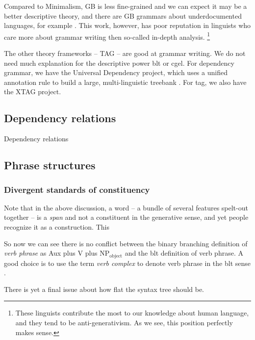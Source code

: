 \documentclass[../main.tex]{subfiles}
\begin{document}
Compared to Minimalism, GB is less fine-grained and we can expect it may be a better descriptive theory,
and there are GB grammars about underdocumented languages, for example \citet{holmer1996parametric}. 
This work, however, has poor reputation in linguists who care more about grammar writing then so-called in-depth
analysis. %
\footnote{
    These linguists contribute the most to our knowledge about human language, and they tend to 
    be anti-generativism. As we see, this position perfectly makes sense.
}%

The other theory frameworks -- TAG -- are good at grammar writing. We do not need much explanation for 
the descriptive power \ac{blt} or \ac{cgel}. For dependency grammar, we have the Universal Dependency 
project, which uses a unified annotation rule to build a large, multi-linguistic treebank \citep{ud}.
For \ac{tag}, we also have the XTAG project. %

\subsection{Dependency relations}

Dependency relations


\subsection{Phrase structures}

\subsubsection{Divergent standards of constituency}

Note that in the above discussion, a word -- a bundle of several features spelt-out together -- is a \emph{span}
and not a constituent in the generative sense, and yet people recognize it as a construction. This %

So now we can see there is no conflict between the binary branching definition of \emph{verb phrase} as Aux plus V plus NP$_\text{object}$ and the \ac{blt} definition of verb phrase. A good choice is to use the term 
\emph{verb complex} to denote verb phrase in the \ac{blt} sense \citep{Wilbur2014}.

There is yet a final issue about how flat the syntax tree should be. %
\end{document}
